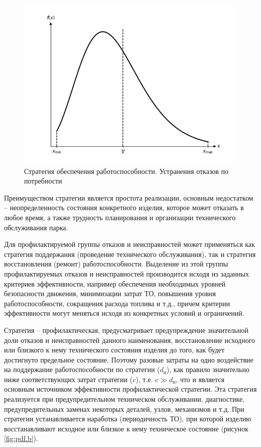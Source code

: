 \documentclass[../nirs.tex]{subfiles}
\begin{document}
\begin{figure}[H]
\centering
\includegraphics[keepaspectratio,width=\textwidth]{./images/pdf.a.png}
\caption{Стратегия обеспечения работоспособности. Устранения отказов по
    потребности}
\label{fig:pdf.a}
\end{figure}

Преимуществом стратегии  является простота реализации, основным
недостатком -- неопределенность состояния конкретного изделия, которое может
отказать в любое время, а также трудность планирования и организации
технического обслуживания парка.

Для профилактируемой группы отказов и неисправностей может применяться как
стратегия поддержания (проведение технического обслуживания), так и стратегия
восстановления (ремонт) работоспособности. Выделение из этой группы
профилактируемых отказов и неисправностей производится исходя из заданных
критериев эффективности, например обеспечения необходимых уровней безопасности
движения, минимизации затрат ТО, повышения уровня работоспособности,
сокращения расхода топлива и т.д., причем критерии эффективности могут меняться
исходя из конкретных условий и ограничений.

Стратегия  -- профилактическая, предусматривает предупреждение
значительной доли отказов и неисправностей данного наименования, восстановление
исходного или близкого к нему технического состояния изделия до того, как будет
достигнуто предельное состояние. Поэтому разовые затраты на одно воздействие на
поддержание работоспособности по стратегии  ($d_{\text{п}}$), как правило
значительно ниже соответствующих затрат стратегии  ($c$), т.е. $c \gg
d_{\text{п}}$, что и является основным источником эффективности профилактической
стратегии. Эта стратегия реализуется при предупредительном техническом
обслуживании, диагностике, предупредительных заменах некоторых деталей, узлов,
механизмов и т.д. При стратегии  устанавливается наработка (периодичность
ТО), при которой изделию восстанавливают исходное или близкое к нему техническое
состояние (рисунок \ref{fig:pdf.b}).
\end{document}
